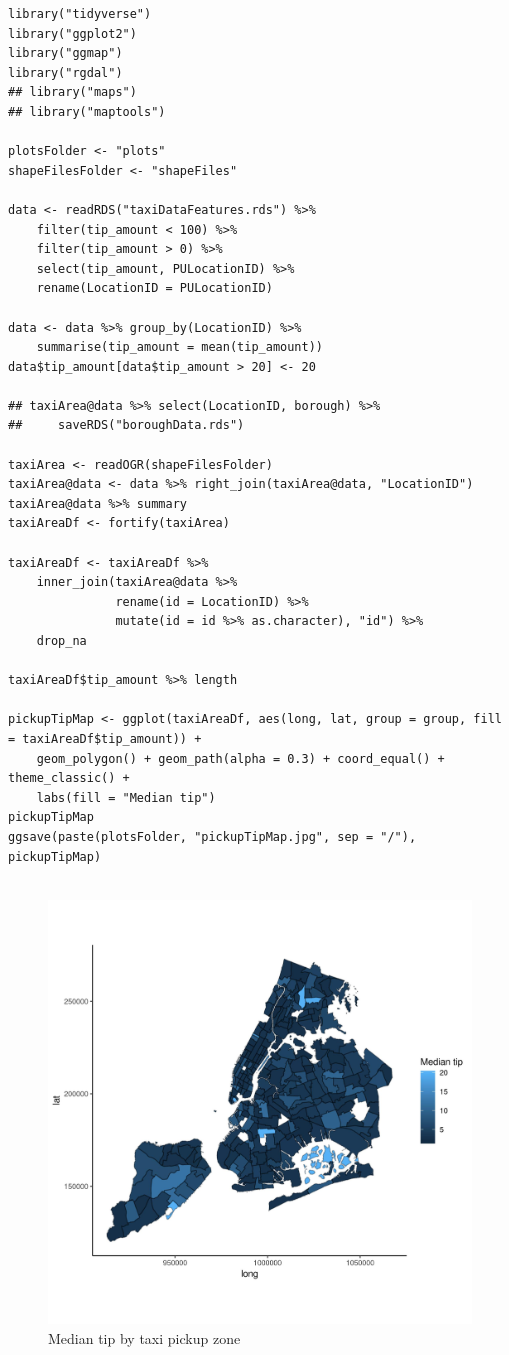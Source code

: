 \documentclass[11pt]{article}
\begin{document}
\begin{verbatim}
library("tidyverse")
library("ggplot2")
library("ggmap")
library("rgdal")
## library("maps")
## library("maptools")

plotsFolder <- "plots"
shapeFilesFolder <- "shapeFiles"

data <- readRDS("taxiDataFeatures.rds") %>%
    filter(tip_amount < 100) %>%
    filter(tip_amount > 0) %>%
    select(tip_amount, PULocationID) %>%
    rename(LocationID = PULocationID)

data <- data %>% group_by(LocationID) %>%
    summarise(tip_amount = mean(tip_amount))
data$tip_amount[data$tip_amount > 20] <- 20

## taxiArea@data %>% select(LocationID, borough) %>%
##     saveRDS("boroughData.rds")

taxiArea <- readOGR(shapeFilesFolder)
taxiArea@data <- data %>% right_join(taxiArea@data, "LocationID")
taxiArea@data %>% summary
taxiAreaDf <- fortify(taxiArea)

taxiAreaDf <- taxiAreaDf %>%
    inner_join(taxiArea@data %>%
               rename(id = LocationID) %>%
               mutate(id = id %>% as.character), "id") %>%
    drop_na

taxiAreaDf$tip_amount %>% length

pickupTipMap <- ggplot(taxiAreaDf, aes(long, lat, group = group, fill = taxiAreaDf$tip_amount)) +
    geom_polygon() + geom_path(alpha = 0.3) + coord_equal() + theme_classic() +
    labs(fill = "Median tip")
pickupTipMap
ggsave(paste(plotsFolder, "pickupTipMap.jpg", sep = "/"), pickupTipMap)


\end{verbatim}

\begin{figure}[htbp]
\centering
\includegraphics[width=.9\linewidth]{./plots/pickupTipMap.jpg}
\caption{\label{fig:orgf7a8b3d}
Median tip by taxi pickup zone}
\end{figure}
\end{document}
